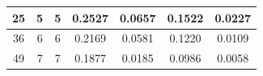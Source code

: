 \documentclass{article}
\begin{document}
\begin{table}[]
{\begin{tabular}{|c|c|c|c|c|c|c|}
25                                   & 5                         & 5                         & 0.2527                                                                                                                                                                                        & 0.0657                                                                                                                                                                                       & 0.1522                                                                                                                                                                                                                                                   & 0.0227                                                                                                                                                                                                                                                \\ \hline
36                                   & 6                         & 6                         & 0.2169                                                                                                                                                                                        & 0.0581                                                                                                                                                                                       & 0.1220                                                                                                                                                                                                                                                   & 0.0109                                                                                                                                                                                                                                                \\ \hline
49                                   & 7                         & 7                         & 0.1877                                                                                                                                                                                        & 0.0185                                                                                                                                                                                       & 0.0986                                                                                                                                                                                                                                                   & 0.0058                                                                                                                                                                                                                                                \\ \hline

\end{tabular}}
\end{table}
\end{document}
